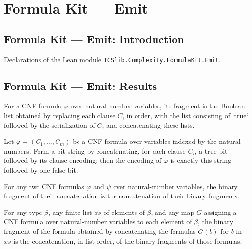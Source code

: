 \section{Formula Kit --- Emit}
\subsection*{Formula Kit --- Emit: Introduction}

Declarations of the Lean module \texttt{TCSlib.Complexity.FormulaKit.Emit}.

\subsection*{Formula Kit --- Emit: Results}

\begin{definition}
\label{Complexity.FormulaKit.fragment}
\leanok
{}
For a CNF formula $\varphi$ over natural-number variables, its fragment is the Boolean
list obtained by replacing each clause $C$, in order, with the list consisting of `true`
followed by the serialization of $C$, and concatenating these lists.
\end{definition}

\begin{theorem}
\label{Complexity.FormulaKit.serialize_eq_fragment}
\leanok
{}
Let $\varphi=(C_1,\ldots,C_m)$ be a CNF formula over variables indexed by the natural
numbers. Form a bit string by concatenating, for each clause $C_i$, a true bit followed
by its clause encoding; then the encoding of $\varphi$ is exactly this string followed
by one false bit.
\end{theorem}

\begin{theorem}
\label{Complexity.FormulaKit.fragment_append}
\leanok
{}
For any two CNF formulas $\varphi$ and $\psi$ over natural-number variables, the binary
fragment of their concatenation is the concatenation of their binary fragments.
\end{theorem}

\begin{theorem}
\label{Complexity.FormulaKit.fragment_flatMap}
\leanok
{}
For any type $\beta$, any finite list $xs$ of elements of $\beta$, and any map $G$
assigning a CNF formula over natural-number variables to each element of $\beta$, the
binary fragment of the formula obtained by concatenating the formulas $G(b)$ for $b$ in
$xs$ is the concatenation, in list order, of the binary fragments of those formulas.
\end{theorem}

